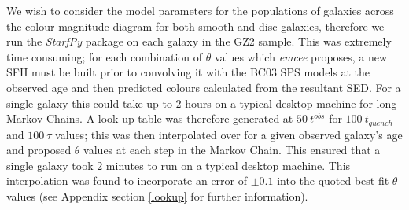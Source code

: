 \documentclass[useAMS,usenatbib]{mn2e}
\def\changed    {\color{titlecol} }
\begin{document}
{\changed We wish to consider the model parameters for the populations of galaxies across the colour magnitude diagram for both smooth and disc galaxies, therefore we run the \emph{StarfPy} package on each galaxy in the GZ2 sample. This was extremely time consuming; for each combination of $\theta$ values which \emph{emcee} proposes, a new SFH must be built prior to convolving it with the BC03 SPS models at the observed age and then predicted colours calculated from the resultant SED. For a single galaxy this could take up to 2 hours on a typical desktop machine for long Markov Chains. A look-up table was therefore generated at $50 ~t^{obs}$ for $100 ~t_{quench}$ and $100 ~\tau$ values; this was then interpolated over for a given observed galaxy's age and proposed $\theta$ values at each step in the Markov Chain. This ensured that a single galaxy took 2 minutes to run on a typical desktop machine. This interpolation was found to incorporate an error of $\pm 0.1$ into the quoted best fit $\theta$ values (see Appendix section \ref{lookup} for further information). 

}
\end{document}
